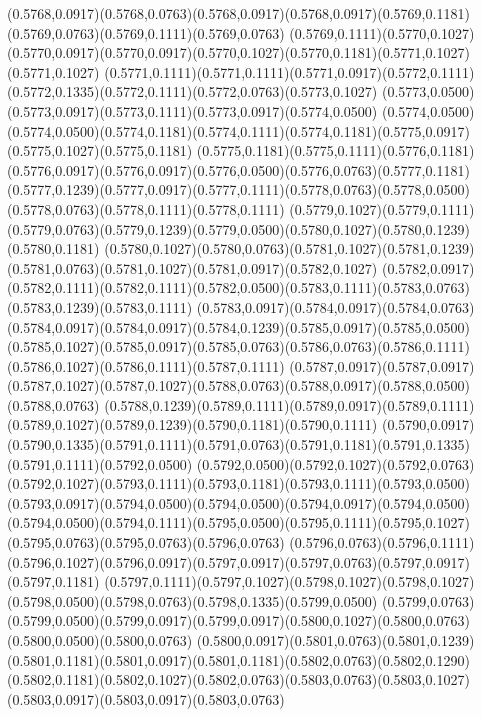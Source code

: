 (0.5768,0.0917)(0.5768,0.0763)(0.5768,0.0917)(0.5768,0.0917)(0.5769,0.1181)(0.5769,0.0763)(0.5769,0.1111)(0.5769,0.0763)
(0.5769,0.1111)(0.5770,0.1027)(0.5770,0.0917)(0.5770,0.0917)(0.5770,0.1027)(0.5770,0.1181)(0.5771,0.1027)(0.5771,0.1027)
(0.5771,0.1111)(0.5771,0.1111)(0.5771,0.0917)(0.5772,0.1111)(0.5772,0.1335)(0.5772,0.1111)(0.5772,0.0763)(0.5773,0.1027)
(0.5773,0.0500)(0.5773,0.0917)(0.5773,0.1111)(0.5773,0.0917)(0.5774,0.0500)
\PST@Solid(0.5774,0.0500)(0.5774,0.0500)(0.5774,0.1181)(0.5774,0.1111)(0.5774,0.1181)(0.5775,0.0917)(0.5775,0.1027)(0.5775,0.1181)
(0.5775,0.1181)(0.5775,0.1111)(0.5776,0.1181)(0.5776,0.0917)(0.5776,0.0917)(0.5776,0.0500)(0.5776,0.0763)(0.5777,0.1181)
(0.5777,0.1239)(0.5777,0.0917)(0.5777,0.1111)(0.5778,0.0763)(0.5778,0.0500)(0.5778,0.0763)(0.5778,0.1111)(0.5778,0.1111)
(0.5779,0.1027)(0.5779,0.1111)(0.5779,0.0763)(0.5779,0.1239)(0.5779,0.0500)(0.5780,0.1027)(0.5780,0.1239)(0.5780,0.1181)
(0.5780,0.1027)(0.5780,0.0763)(0.5781,0.1027)(0.5781,0.1239)(0.5781,0.0763)(0.5781,0.1027)(0.5781,0.0917)(0.5782,0.1027)
(0.5782,0.0917)(0.5782,0.1111)(0.5782,0.1111)(0.5782,0.0500)(0.5783,0.1111)(0.5783,0.0763)(0.5783,0.1239)(0.5783,0.1111)
(0.5783,0.0917)(0.5784,0.0917)(0.5784,0.0763)(0.5784,0.0917)(0.5784,0.0917)(0.5784,0.1239)(0.5785,0.0917)(0.5785,0.0500)
(0.5785,0.1027)(0.5785,0.0917)(0.5785,0.0763)(0.5786,0.0763)(0.5786,0.1111)(0.5786,0.1027)(0.5786,0.1111)(0.5787,0.1111)
(0.5787,0.0917)(0.5787,0.0917)(0.5787,0.1027)(0.5787,0.1027)(0.5788,0.0763)(0.5788,0.0917)(0.5788,0.0500)(0.5788,0.0763)
(0.5788,0.1239)(0.5789,0.1111)(0.5789,0.0917)(0.5789,0.1111)(0.5789,0.1027)(0.5789,0.1239)(0.5790,0.1181)(0.5790,0.1111)
(0.5790,0.0917)(0.5790,0.1335)(0.5791,0.1111)(0.5791,0.0763)(0.5791,0.1181)(0.5791,0.1335)(0.5791,0.1111)(0.5792,0.0500)
(0.5792,0.0500)(0.5792,0.1027)(0.5792,0.0763)(0.5792,0.1027)(0.5793,0.1111)(0.5793,0.1181)(0.5793,0.1111)(0.5793,0.0500)
(0.5793,0.0917)(0.5794,0.0500)(0.5794,0.0500)(0.5794,0.0917)(0.5794,0.0500)
\PST@Solid(0.5794,0.0500)(0.5794,0.1111)(0.5795,0.0500)(0.5795,0.1111)(0.5795,0.1027)(0.5795,0.0763)(0.5795,0.0763)(0.5796,0.0763)
(0.5796,0.0763)(0.5796,0.1111)(0.5796,0.1027)(0.5796,0.0917)(0.5797,0.0917)(0.5797,0.0763)(0.5797,0.0917)(0.5797,0.1181)
(0.5797,0.1111)(0.5797,0.1027)(0.5798,0.1027)(0.5798,0.1027)(0.5798,0.0500)(0.5798,0.0763)(0.5798,0.1335)(0.5799,0.0500)
(0.5799,0.0763)(0.5799,0.0500)(0.5799,0.0917)(0.5799,0.0917)(0.5800,0.1027)(0.5800,0.0763)(0.5800,0.0500)(0.5800,0.0763)
(0.5800,0.0917)(0.5801,0.0763)(0.5801,0.1239)(0.5801,0.1181)(0.5801,0.0917)(0.5801,0.1181)(0.5802,0.0763)(0.5802,0.1290)
(0.5802,0.1181)(0.5802,0.1027)(0.5802,0.0763)(0.5803,0.0763)(0.5803,0.1027)(0.5803,0.0917)(0.5803,0.0917)(0.5803,0.0763)
